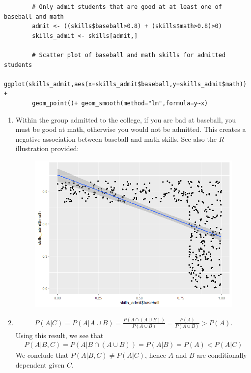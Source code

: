 \begin{exercise}[BH.2.36]
\begin{solution}
\begin{verbatim}
        # Only admit students that are good at at least one of baseball and math
        admit <- ((skills$baseball>0.8) + (skills$math>0.8)>0)
        skills_admit <- skills[admit,]

        # Scatter plot of baseball and math skills for admitted students
        ggplot(skills_admit,aes(x=skills_admit$baseball,y=skills_admit$math)) +
        geom_point()+ geom_smooth(method="lm",formula=y~x)
    \end{verbatim}
    \begin{enumerate}
        \item Within the group admitted to the college, if you are bad at baseball, you must be good at math, otherwise you would not be admitted. This creates a negative association between baseball and math skills. See also the $R$ illustration provided:
        \begin{figure}[htbp!]
            \includegraphics[width=0.5\columnwidth]{figures/bh-2.36-figure.png}
        \end{figure}
        \item \begin{align*}
            P(A|C) =P(A|A\cup B) = \frac{P(A\cap(A\cup B))}{P(A\cup B)} = \frac{P(A)}{P(A\cup B)}>P(A).
        \end{align*}
        Using this result, we see that
        \begin{align*}
            P(A|B,C) = P(A|B\cap (A\cup B)) =P(A|B) = P(A)<P(A|C)
        \end{align*}
        We conclude that $P(A|B,C)\neq P(A|C)$, hence $A$ and $B$ are conditionally dependent given $C$.
    \end{enumerate}
\end{solution}
\end{exercise}

